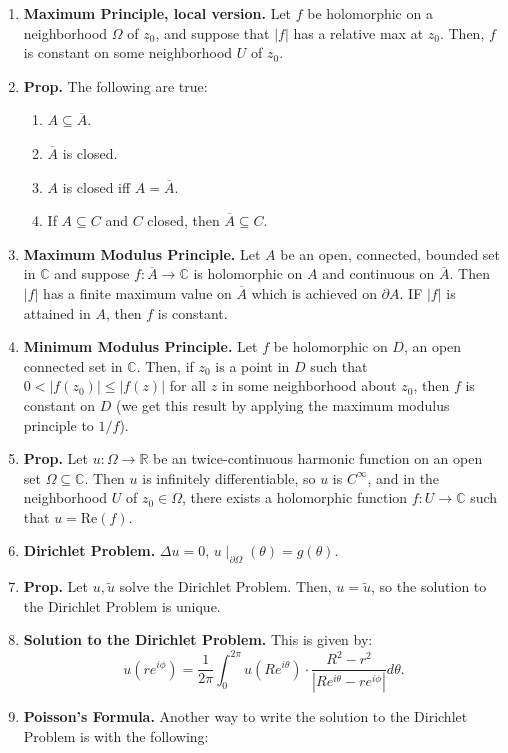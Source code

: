 \documentclass[12pt]{article}
\theoremstyle{definition}
\theoremstyle{named}
\begin{document}
{\begin{multicols}{2}
\begin{spacing}{1.01}
\begin{enumerate}
    \item \textbf{Maximum Principle, local version. } Let $f$ be holomorphic on a neighborhood $\Omega$ of $z_0$, and suppose that $|f|$ has a relative max at $z_0$. Then, $f$ is constant on some neighborhood $U$ of $z_0$. 
    \item \textbf{Prop. } The following are true: 
    \begin{enumerate}
        \item $A \subseteq \overline{A}$. 
        \item $\overline{A}$ is closed. 
        \item $A$ is closed iff $A = \overline{A}$. 
        \item If $A \subseteq C$ and $C$ closed, then $\overline{A} \subseteq C$. 
    \end{enumerate}
    \item \textbf{Maximum Modulus Principle. } Let $A$ be an open, connected, bounded set in $\mathbb{C}$ and suppose $f: \overline{A} \to \mathbb{C}$ is holomorphic on $A$ and continuous on $\overline{A}$. Then $|f|$ has a finite maximum value on $\overline{A}$ which is achieved on $\partial A$. IF $|f|$ is attained in $A$, then $f$ is constant. 
    \item \textbf{Minimum Modulus Principle. } Let $f$ be holomorphic on $D$, an open connected set in $\mathbb{C}$. Then, if $z_0$ is a point in $D$ such that $0 < |f(z_0)| \leq |f(z)|$ for all $z$ in some neighborhood about $z_0$, then $f$ is constant on $D$ (we get this result by applying the maximum modulus principle to $1/f$). 
    \item \textbf{Prop. } Let $u: \Omega \to \mathbb{R}$ be an twice-continuous harmonic function on an open set $\Omega \subseteq \mathbb{C}$. Then $u$ is infinitely differentiable, so $u$ is $C^\infty$, and in the neighborhood $U$ of $z_0 \in \Omega$, there exists a holomorphic function $f: U \to \mathbb{C}$ such that $u = \textrm{Re}(f)$. 
    \item \textbf{Dirichlet Problem. } $\Delta u = 0$, $u \mid_{\partial \Omega} (\theta) = g(\theta)$. 
    \item \textbf{Prop. } Let $u,\tilde{u}$ solve the Dirichlet Problem. Then, $u = \tilde{u}$, so the solution to the Dirichlet Problem is unique. 
    \item \textbf{Solution to the Dirichlet Problem. } This is given by: 
    $$
    u(re^{i\phi}) = \frac{1}{2\pi} \int_{0}^{2\pi} u(Re^{i\theta}) \cdot \frac{R^2 - r^2}{|Re^{i\theta} - re^{i\phi}|} d\theta. 
    $$
    \item \textbf{Poisson's Formula. } Another way to write the solution to the Dirichlet Problem is with the following: 

\end{enumerate}
\end{spacing}
\end{multicols}}
\end{document}
